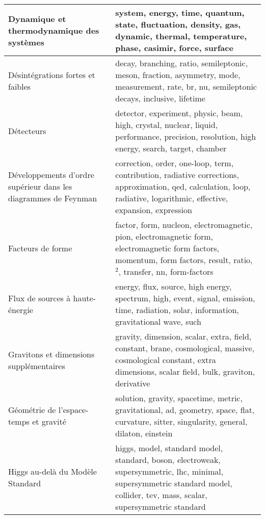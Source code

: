 \begin{longtable}[H]{p{}|p{}}
Dynamique et thermodynamique des systèmes                       &                                                                             system, energy, time, quantum, state, fluctuation, density, gas, dynamic, thermal, temperature, phase, casimir, force, surface \\ \midrule
Désintégrations fortes et faibles                               &                                                               decay, branching, ratio, semileptonic, meson, fraction, asymmetry, mode, measurement, rate, br, nu, semileptonic decays, inclusive, lifetime \\ \midrule
Détecteurs                                                      &                                                               detector, experiment, physic, beam, high, crystal, nuclear, liquid, performance, precision, resolution, high energy, search, target, chamber \\ \midrule
Développements d'ordre supérieur dans les diagrammes de Feynman &                                    correction, order, one-loop, term, contribution, radiative corrections, approximation, qed, calculation, loop, radiative, logarithmic, effective, expansion, expression \\ \midrule
Facteurs de forme                                               &                                  factor, form, nucleon, electromagnetic, pion, electromagnetic form, electromagnetic form factors, momentum, form factors, result, ratio, $^2$, transfer, nn, form-factors \\ \midrule
Flux de sources à haute-énergie                                 &                                                                  energy, flux, source, high energy, spectrum, high, event, signal, emission, time, radiation, solar, information, gravitational wave, such \\ \midrule
Gravitons et dimensions supplémentaires                         &                                        gravity, dimension, scalar, extra, field, constant, brane, cosmological, massive, cosmological constant, extra dimensions, scalar field, bulk, graviton, derivative \\ \midrule
Géométrie de l'espace-temps et gravité                          &                                                                 solution, gravity, spacetime, metric, gravitational, ad, geometry, space, flat, curvature, sitter, singularity, general, dilaton, einstein \\ \midrule
Higgs au-delà du Modèle Standard                                &                              higgs, model, standard model, standard, boson, electroweak, supersymmetric, lhc, minimal, supersymmetric standard model, collider, tev, mass, scalar, supersymmetric standard \\ \midrule

\end{longtable}
